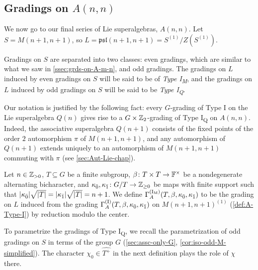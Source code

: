 
\subsection{Gradings on \texorpdfstring{$A(n,n)$}{A(n,n)}}\label{ssec:grds-on-Ann}

We now go to our final series of Lie superalgebras, $A(n,n)$. 
Let $S = M(n+1, n+1)$,  
so $L = \mathfrak{psl} (n+1, n+1) = S^{(1)}/Z(S^{(1)})$. 

Gradings on $S$ are separated into two classes: even gradings, which are similar to what we saw in \cref{ssec:grds-on-A-m-n}, and odd gradings. 
The gradings on $L$ induced by even gradings on $S$ will be said to be of \emph{Type I\textsubscript{M}}, and the gradings on $L$ induced by odd gradings on $S$ will be said to be \emph{Type I\textsubscript{Q}}. 

\begin{remark}\label{prop:Q-implies-GxZZ2-grading-on-M}
    Our notation is justified by the following fact: 
    every $G$-grading of Type I on the Lie superalgebra $Q(n)$ gives rise to a $G\times \mathbb{Z}_2$-grading of Type I\textsubscript{Q} on $A(n,n)$. 
    Indeed, the associative superalgebra $Q(n+1)$ consists of the fixed points of the order $2$ automorphism $\pi$ of $M(n+1, n+1)$, and any automorphism of $Q(n+1)$ extends uniquely to an automorphism of $M(n+1, n+1)$ commuting with $\pi$ (see \cref{sec:Aut-Lie-chap}). 
\end{remark}

\begin{defi}\label{def:Type-I_M}
    Let $n\in \mathbb{Z}_{> 0}$, $T \subseteq G$ be a finite subgroup, $\beta\colon T\times T \to \mathbb{F}^\times$ be a nondegenerate alternating bicharacter, and $\kappa_{\bar{0}}, \kappa_{\bar{1}} \colon G/T \to \mathbb{Z}_{\geq 0}$ be maps with finite support such that $|\kappa_{\bar{0}}| \sqrt{|T|} = |\kappa_{\bar{1}}| \sqrt{|T|} = n+1$. 
    We define $\Gamma^{\mathrm{(I_M)}}_A(T, \beta, \kappa_{\bar{0}}, \kappa_{\bar{1}})$ to be the grading on $L$ induced from the grading $\Gamma^{\mathrm{(I)}}_A(T, \beta, \kappa_{\bar{0}}, \kappa_{\bar{1}})$ on $M(n+1, n+1)^{(1)}$ (\cref{def:A-Type-I}) by reduction modulo the center.
\end{defi}

To parametrize the gradings of Type I\textsubscript{Q}, we recall the parametrization of odd gradings on $S$ in terms of the group $G$ (\cref{sec:assc-only-G}, \cref{cor:iso-odd-M-simplified}). 
The character $\chi_0 \in \widehat{T^+}$ in the next definition plays the role of $\chi$ there. 


